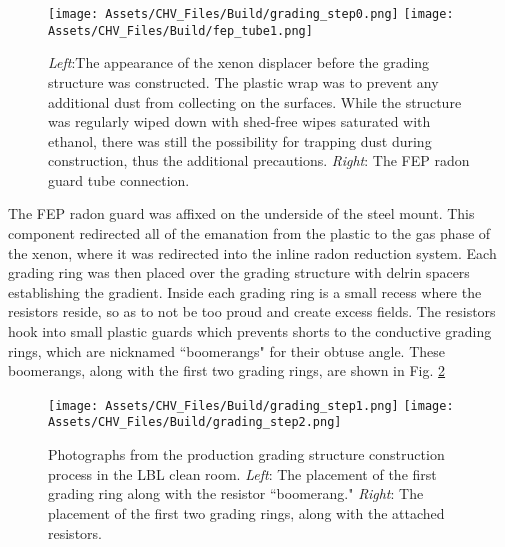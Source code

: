 \begin{figure}
    \centering
    \texttt{[image: Assets/CHV\_Files/Build/grading\_step0.png]}
     \texttt{[image: Assets/CHV\_Files/Build/fep\_tube1.png]}
    \caption[Construction photos of the LZ-CHV xenon displacer in the LBL clean room.]%
    {\textit{Left}:The appearance of the xenon displacer before the grading structure was constructed.
    The plastic wrap was to prevent any additional dust from collecting on the surfaces. 
    While the structure was regularly wiped down with shed-free wipes saturated with ethanol, there was still the possibility for trapping dust during construction, thus the additional precautions.
    \textit{Right}: The FEP radon guard tube connection.}
    \label{fig:grading_step0}
\end{figure}

The FEP radon guard was affixed on the underside of the steel mount.
This component redirected all of the emanation from the plastic to the gas phase of the xenon, where it was redirected into the inline radon reduction system.
Each grading ring was then placed over the grading structure with delrin spacers establishing the gradient.
Inside each grading ring is a small recess where the resistors reside, so as to not be too proud and create excess fields.
The resistors hook into small plastic guards which prevents shorts to the conductive grading rings, which are nicknamed ``boomerangs" for their obtuse angle.
These boomerangs, along with the first two grading rings, are shown in Fig. \ref{fig:boomerang}

\begin{figure}
    \centering
    \texttt{[image: Assets/CHV\_Files/Build/grading\_step1.png]}
    \texttt{[image: Assets/CHV\_Files/Build/grading\_step2.png]}
    \caption[ Photographs from the production grading structure construction process in the LBL clean room.]%
    { Photographs from the production grading structure construction process in the LBL clean room.
    \textit{Left}: The placement of the first grading ring along with the resistor ``boomerang."
    \textit{Right}: The placement of the first two grading rings, along with the attached resistors.}
    \label{fig:boomerang}
\end{figure}

